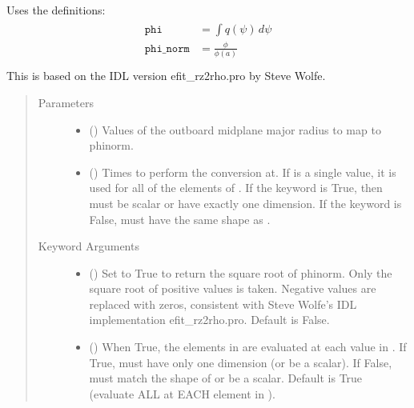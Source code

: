 \documentclass[letterpaper,10pt,english]{sphinxmanual}
\begin{document}
\begin{fulllineitems}
\begin{fulllineitems}
Uses the definitions:
\begin{align*}\!\begin{aligned}
\texttt{phi} &= \int q(\psi)\,d\psi\\
\texttt{phi\_norm} &= \frac{\phi}{\phi(a)}\\
\end{aligned}\end{align*}
This is based on the IDL version efit\_rz2rho.pro by Steve Wolfe.
\begin{quote}\begin{description}
\item[{Parameters}] \leavevmode\begin{itemize}
\item {} 
 () \textendash{} Values of the outboard midplane
major radius to map to phinorm.

\item {} 
 () \textendash{} Times to perform the conversion at.
If  is a single value, it is used for all of the elements of
. If the  keyword is True, then  must be scalar
or have exactly one dimension. If the  keyword is False,
 must have the same shape as .

\end{itemize}

\item[{Keyword Arguments}] \leavevmode\begin{itemize}
\item {} 
 () \textendash{} Set to True to return the square root of phinorm.
Only the square root of positive values is taken. Negative
values are replaced with zeros, consistent with Steve Wolfe’s
IDL implementation efit\_rz2rho.pro. Default is False.

\item {} 
 () \textendash{} When True, the elements in  are evaluated
at each value in . If True,  must have only one dimension
(or be a scalar). If False,  must match the shape of 
or be a scalar. Default is True (evaluate ALL  at EACH
element in ).


\end{itemize}
\end{description}
\end{quote}
\end{fulllineitems}
\end{fulllineitems}
\end{document}
